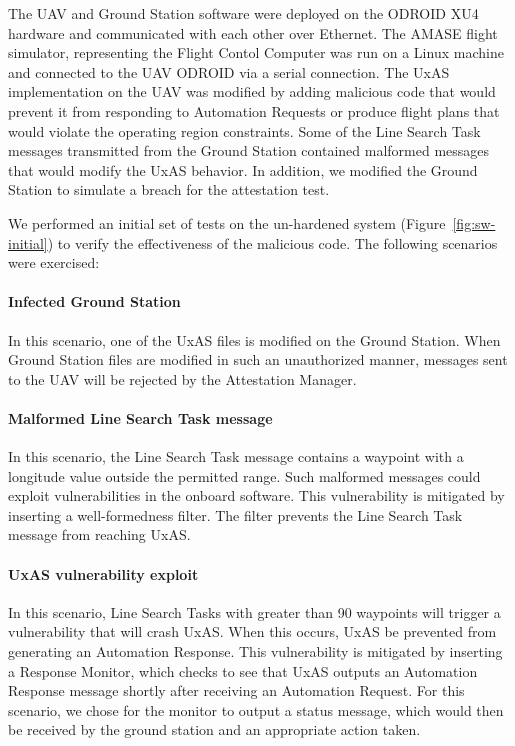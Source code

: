 The UAV and Ground Station software were deployed on the ODROID XU4 hardware and communicated with each other over Ethernet.  The AMASE flight simulator, representing the Flight Contol Computer was run on a Linux machine and connected to the UAV ODROID via a serial connection.  The UxAS implementation on the UAV was modified by adding malicious code that would prevent it from responding to Automation Requests or produce flight plans that would violate the operating region constraints.  Some of the Line Search Task messages transmitted from the Ground Station contained malformed messages that would modify the UxAS behavior. In addition, we modified the Ground Station to simulate a breach for the attestation test.

We performed an initial set of tests on the un-hardened system (Figure~\ref{fig:sw-initial}) to verify the effectiveness of the malicious code.  The following scenarios were exercised:

\paragraph{Infected Ground Station} In this scenario, one of the UxAS files is modified on the Ground Station. When Ground Station files are modified in such an unauthorized manner, messages sent to the UAV will be rejected by the Attestation Manager.  

\paragraph{Malformed Line Search Task message} In this scenario, the Line Search Task message contains a waypoint with a longitude value outside the permitted range.  Such malformed messages could exploit vulnerabilities in the onboard software.  This vulnerability is mitigated by inserting a well-formedness filter.  The filter prevents the Line Search Task message from reaching UxAS.

\paragraph{UxAS vulnerability exploit} In this scenario, Line Search Tasks with greater than 90 waypoints will trigger a vulnerability that will crash UxAS.   When this occurs, UxAS be prevented from generating an Automation Response.  This vulnerability is mitigated by inserting a Response Monitor, which checks to see that UxAS outputs an Automation Response message shortly after receiving an Automation Request.  For this scenario, we chose for the monitor to output a status message, which would then be received by the ground station and an appropriate action taken.


